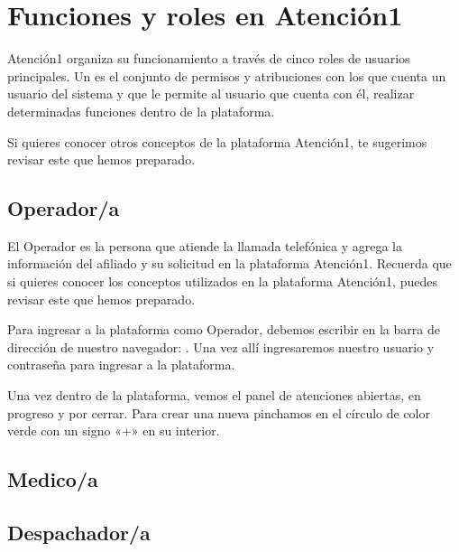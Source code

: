 \documentclass[letterpaper,10pt,spanish]{sphinxmanual}
\begin{document}
\chapter{Funciones y roles en Atención\sphinxhyphen{}1}
\label{\detokenize{02roles_funciones:funciones-y-roles-en-atencion-1}}\label{\detokenize{02roles_funciones::doc}}
Atención\sphinxhyphen{}1 organiza su funcionamiento a través de cinco roles de usuarios principales. Un  es el conjunto de permisos y atribuciones con los que cuenta un usuario del sistema y que le permite al usuario que cuenta con él, realizar determinadas funciones dentro de la plataforma.

Si quieres conocer otros conceptos de la plataforma Atención\sphinxhyphen{}1, te sugerimos revisar este {\hyperref[\detokenize{05glosario:glosario}]{}} que hemos preparado.


\section{Operador/a}
\label{\detokenize{01operador:operador-a}}\label{\detokenize{01operador::doc}}
El Operador es la persona que atiende la llamada telefónica y agrega la información del afiliado y su solicitud en la plataforma Atención\sphinxhyphen{}1. Recuerda que si quieres conocer los conceptos utilizados en la plataforma Atención\sphinxhyphen{}1, puedes revisar este {\hyperref[\detokenize{05glosario:glosario}]{}} que hemos preparado.

Para ingresar a la plataforma como Operador, debemos escribir en la barra de dirección de nuestro navegador: . Una vez allí ingresaremos nuestro usuario y contraseña para ingresar a la plataforma.

\noindent{}

Una vez dentro de la plataforma, vemos el panel de atenciones abiertas, en progreso y por cerrar. Para crear una nueva  pinchamos en el círculo de color verde con un signo «+» en su interior.


\section{Medico/a}
\label{\detokenize{02medico:medico-a}}\label{\detokenize{02medico::doc}}

\section{Despachador/a}
\label{\detokenize{03despachador:despachador-a}}\label{\detokenize{03despachador::doc}}
\end{document}
